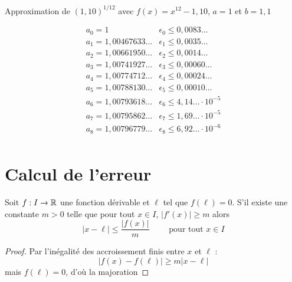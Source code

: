  
\begin{frame}
Approximation de $(1,10)^{1/12}$ avec $f(x) = x^{12} - 1,10$, $a=1$ et $b=1,1$

\bigskip

$$
\begin{array}{l|l}
  a_0 = 1                          & \epsilon_0 \le 0,0083\ldots \\
  a_1 = 1,00467633\ldots   & \epsilon_1 \le 0,0035\ldots \\
  a_2 = 1,00661950\ldots   & \epsilon_2 \le 0,0014\ldots \\
  a_3 = 1,00741927\ldots   & \epsilon_3 \le 0,00060\ldots \\
  a_4 = 1,00774712\ldots    & \epsilon_4 \le 0,00024\ldots \\
  a_5 = 1,00788130\ldots    & \epsilon_5 \le 0,00010\ldots\\
  a_6 = 1,00793618\ldots   & \epsilon_6 \le 4,14\ldots \cdot 10^{-5} \\
  a_7 = 1,00795862\ldots   & \epsilon_7 \le 1,69\ldots \cdot 10^{-5} \\
  a_8 = 1,00796779\ldots   & \epsilon_8 \le 6,92\ldots \cdot 10^{-6} \\
\end{array}
$$
\end{frame}




\section{Calcul de l'erreur}

\begin{frame}

\begin{proposition}
 Soit $f : I \to \mathbb{R}$ une fonction dérivable et $\ell$ tel que $f(\ell)=0$.
 S'il existe une constante $m>0$ telle que pour tout $x\in I$, $|f'(x)| \ge m$ alors
 $$|x-\ell| \le \frac{|f(x)|}{m} \qquad \text{ pour tout } x \in I$$
\end{proposition}

\pause

\begin{proof}
  Par l'inégalité des accroissement finis entre $x$ et $\ell$ :
  $$|f(x)-f(\ell)| \ge m |x-\ell|$$
  mais $f(\ell)=0$, d'où la majoration
\end{proof}



\end{frame}


